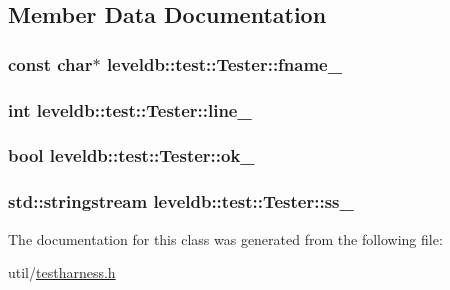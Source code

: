 \subsection{Member Data Documentation}
\hypertarget{classleveldb_1_1test_1_1_tester_ac31d6b42290908b68f6bc1957cc972d7}{
\subsubsection[{fname\-\_\-}]{\setlength{\rightskip}{0pt plus 5cm}const char$\ast$ leveldb\-::test\-::\-Tester\-::fname\-\_\-\hspace{0.3cm}{\ttfamily [private]}}}\label{classleveldb_1_1test_1_1_tester_ac31d6b42290908b68f6bc1957cc972d7}
\hypertarget{classleveldb_1_1test_1_1_tester_a6e4f6de0a9ec707e2d00a0671f605aa9}{
\subsubsection[{line\-\_\-}]{\setlength{\rightskip}{0pt plus 5cm}int leveldb\-::test\-::\-Tester\-::line\-\_\-\hspace{0.3cm}{\ttfamily [private]}}}\label{classleveldb_1_1test_1_1_tester_a6e4f6de0a9ec707e2d00a0671f605aa9}
\hypertarget{classleveldb_1_1test_1_1_tester_ae6eb51d7b83389a6c9c5dc46c53fb025}{
\subsubsection[{ok\-\_\-}]{\setlength{\rightskip}{0pt plus 5cm}bool leveldb\-::test\-::\-Tester\-::ok\-\_\-\hspace{0.3cm}{\ttfamily [private]}}}\label{classleveldb_1_1test_1_1_tester_ae6eb51d7b83389a6c9c5dc46c53fb025}
\hypertarget{classleveldb_1_1test_1_1_tester_abc209cb71659871eea9df987d61cf1e0}{
\subsubsection[{ss\-\_\-}]{\setlength{\rightskip}{0pt plus 5cm}std\-::stringstream leveldb\-::test\-::\-Tester\-::ss\-\_\-\hspace{0.3cm}{\ttfamily [private]}}}\label{classleveldb_1_1test_1_1_tester_abc209cb71659871eea9df987d61cf1e0}


The documentation for this class was generated from the following file\-:\begin{DoxyCompactItemize}
\item 
util/\hyperlink{testharness_8h}{testharness.\-h}\end{DoxyCompactItemize}
